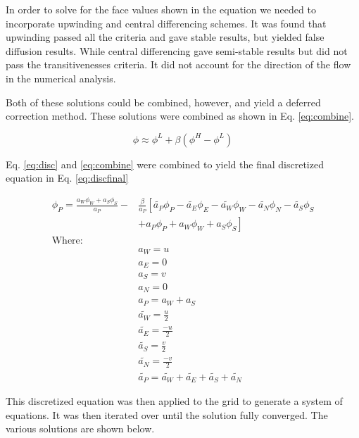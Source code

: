 \documentclass[cleanfoot,cleanhead,twocolumn,10pt,notitlepage]{asme2e}
\begin{document}
In order to solve for the face values shown in the equation we needed to incorporate upwinding and central differencing schemes.  It was found that upwinding passed all the criteria and gave stable results, but yielded false diffusion results.  While central differencing gave semi-stable results but did not pass the transitivenesses criteria.  It did not account for the direction of the flow in the numerical analysis.  

Both of these solutions could be combined, however, and yield a deferred correction method.  These solutions were combined as shown in Eq. \ref{eq:combine}.  

\begin{equation}
\phi \approx \phi^L + \beta (\phi^H - \phi^L)
\label{eq:combine}
\end{equation}

Eq. \ref{eq:disc} and \ref{eq:combine} were combined to yield the final discretized equation in Eq. \ref{eq:discfinal}

\begin{equation}
\begin{aligned}
\phi_P = \frac{a_W\phi_W+a_S\phi_S}{a_P}-&\frac{\beta}{a_P}\left[ \tilde{a_P}\phi_P - \tilde{a_E}\phi_E-\tilde{a_W}\phi_W-\tilde{a_N}\phi_N-\tilde{a_S}\phi_S \right.\\ 
&+\left.a_P\phi_P+a_W\phi_W+a_S\phi_S \right]\\
\text{Where: }\\
&a_W = u\\
&a_E = 0\\
&a_S = v\\
&a_N = 0\\
&a_P = a_W + a_S\\
&\tilde{a_W} = \frac{u}{2}\\
&\tilde{a_E} = \frac{-u}{2}\\
&\tilde{a_S} = \frac{v}{2}\\
&\tilde{a_N} = \frac{-v}{2}\\
&\tilde{a_P} = \tilde{a_W} + \tilde{a_E} + \tilde{a_S} + \tilde{a_N}
\label{eq:discfinal}
\end{aligned}
\end{equation}

This discretized equation was then applied to the grid to generate a system of equations.  It was then iterated over until the solution fully converged.  The various solutions are shown below.




\end{document}
